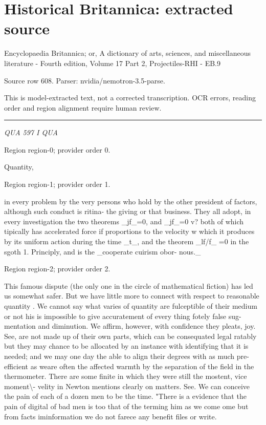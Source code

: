 \documentclass[11pt]{article}
\begin{document}
\section*{Historical Britannica: extracted source}
Encyclopaedia Britannica; or, A dictionary of arts, sciences, and miscellaneous literature - Fourth edition, Volume 17 Part 2, Projectiles-RHI - EB.9\par
{\small Source row 608. Parser: nvidia/nemotron-3.5-parse.\par}
{\small This is model-extracted text, not a corrected transcription. OCR errors, reading order and region alignment require human review.\par}
\hrule\medskip
{\small\itshape QUA 597 I QUA\par}

{\scriptsize\color{gray} Region region-0; provider order 0.\par}
\medskip

Quantity,
\par

{\scriptsize\color{gray} Region region-1; provider order 1.\par}
\medskip

in every problem by the very persons who hold by the other president of factors, although such conduct is ritina- the giving or that business. They all adopt, in every investigation the two theorems \_jf\_=0, and \_jf\_=0 v? both of which tipically has accelerated force if proportions to the velocity w which it produces by its uniform action during the time \_t\_, and the theorem \_lf/f\_ =0 in the sgoth 1. Principly, and is the \_cooperate cuirism obor- nous.\_
\par

{\scriptsize\color{gray} Region region-2; provider order 2.\par}
\medskip

This famous dispute (the only one in the circle of mathematical fiction) has led us somewhat safer. But we have little more to connect with respect to reasonable quantity . We cannot say what varies of quantity are fulceptible of their medium or not his is impossible to give accuratement of every thing fotely false sug-mentation and diminution. We affirm, however, with confidence they pleats, joy. See, are not made up of their own parts, which can be consequated legal ratably but they may chance to be allocated by an instance with identifying that it is needed; and we may one day the able to align their degrees with as much pre- efficient as weare often the affected warmth by the separation of the field in the thermometer. There are some finite in which they were still the mostent, vice moment\textbackslash{}- velity in Newton mentions clearly on matters. See. We can conceive the pain of each of a dozen men to be the time. "There is a evidence that the pain of digital of bad men is too that of the terming him as we come ome but from facts iminformation we do not farece any benefit files or write.
\par
\end{document}
